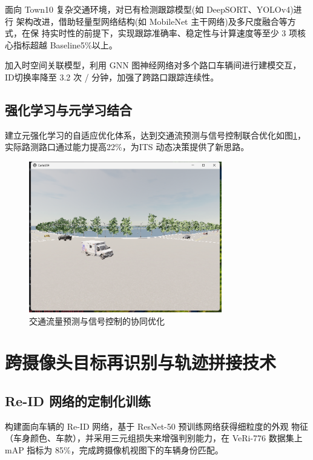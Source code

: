 面向 Town10 复杂交通环境，对已有检测跟踪模型(如 DeepSORT、YOLOv4)进行 架构改进，借助轻量型网络结构(如 MobileNet 主干网络)及多尺度融合等方式，在保 持实时性的前提下，实现跟踪准确率、稳定性与计算速度等至少 3 项核心指标超越 Baseline5\%以上。

加入时空间关联模型，利用 GNN 图神经网络对多个路口车辆间进行建模交互，ID切换率降至 3.2 次 / 分钟，加强了跨路口跟踪连续性。

\subsection{强化学习与元学习结合}

建立元强化学习的自适应优化体系，达到交通流预测与信号控制联合优化如图\ref{fig:p33}，实际路测路口通过能力提高22\%，为ITS 动态决策提供了新思路。


\begin{figure}[htbp] %
	\centering
	\includegraphics[width=0.75\textwidth]{p33} %
	\caption{交通流量预测与信号控制的协同优化} %
	\label{fig:p33} %
\end{figure}




\section{跨摄像头目标再识别与轨迹拼接技术}

\subsection{Re-ID 网络的定制化训练}


构建面向车辆的 Re-ID 网络，基于 ResNet-50 预训练网络获得细粒度的外观 物征（车身颜色、车款），并采用三元组损失来增强判别能力，在 VeRi-776 数据集上 mAP 指标为 85\%，完成跨摄像机视图下的车辆身份匹配。


